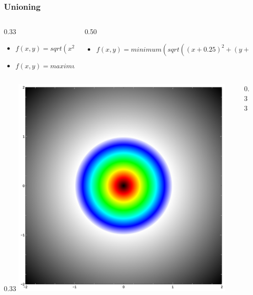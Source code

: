 \documentclass{beamer}
\begin{document}
\begin{frame}
\frametitle{Unioning}
\begin{columns}
  \begin{column}{0.33\textwidth}
    \begin{itemize}
    \item $f(x,y)=sqrt(x^2+y^2)-1$
    \item $f(x,y)=maximum(abs(x),abs(y))-1$
    \end{itemize}
  \end{column}
  \begin{column}{0.50\textwidth}
    \begin{itemize}
    \item $f(x,y)=minimum(sqrt((x+0.25)^2+(y+0.25)^2)-1,maximum(abs(x-0.25),abs(y-0.25))-1)$
    \end{itemize}
  \end{column}
\end{columns}
\begin{columns}
  \begin{column}{0.33\textwidth}
    \includegraphics[width=0.9\textwidth, left]{implicit_circle.jpg}
  \end{column}
  \begin{column}{0.33\textwidth}

\end{column}
\end{columns}
\end{frame}
\end{document}
